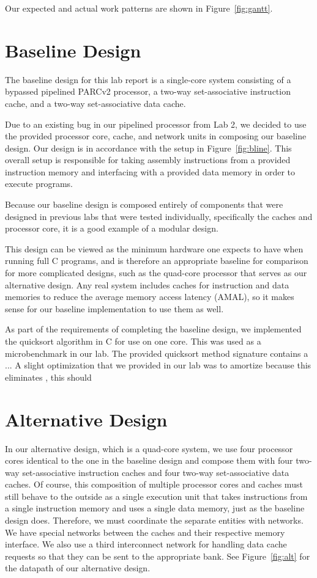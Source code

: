 \documentclass[10pt]{article}
\begin{document}
Our expected and actual work patterns are shown in Figure~\ref{fig:gantt}.


\section{Baseline Design}

The baseline design for this lab report is a single-core system consisting of a bypassed pipelined PARCv2 
processor, a two-way set-associative instruction cache, and a two-way set-associative data cache. 

Due to an existing bug in our pipelined processor from Lab 2, we decided to use the provided processor core, 
cache, and network units in composing our baseline design. Our design is in accordance with the setup in 
Figure~\ref{fig:bline}. This overall setup is responsible for taking assembly instructions from a provided
instruction memory and interfacing with a provided data memory in order to execute programs.

Because our baseline design is composed entirely of components that were designed in previous labs that were 
tested individually, specifically the caches and processor core, it is a good example of a modular design. 

This design can be viewed as the minimum hardware one expects to have when running full C programs, and is therefore
an appropriate baseline for comparison for more complicated designs, such as the quad-core processor that serves as
our alternative design. Any real system includes caches for instruction and data memories to reduce the average memory
access latency (AMAL), so it makes sense for our baseline implementation to use them as well. 

As part of the requirements of completing the baseline design, we implemented the quicksort algorithm in C for use on
one core. This was used as a microbenchmark in our lab. The provided quicksort method signature contains a ...
A slight optimization that we provided in our lab was to amortize
because this eliminates , this should 



\section{Alternative Design}

In our alternative design, which is a quad-core system, we use four processor cores identical to the one in the baseline design and compose them with four two-way set-associative instruction caches and four two-way set-associative data caches. Of course, this composition of multiple processor cores and caches must still behave to the outside as a single execution unit that takes instructions from a single instruction memory and uses a single data memory, just as the baseline design does. Therefore, we must coordinate the separate entities with networks. We have special networks between the caches and their respective memory interface. We also use a third interconnect network for handling data cache requests so that they can be sent to the appropriate bank. See Figure~\ref{fig:alt} for the datapath of our alternative design.
\end{document}
